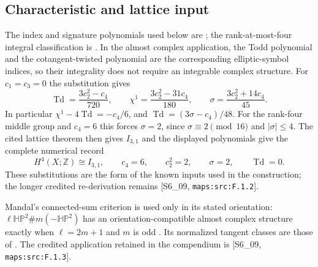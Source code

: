 \subsection{Characteristic and lattice input}
The index and signature polynomials used below are
\cite[equations (1.2)--(1.4), pp.~3--4]{ffEsoleKang}; the
rank-at-most-four integral classification is
\cite[Theorem 2.2.1, p.~61]{ffPetersSterk}.  In the almost
complex application, the Todd polynomial and the cotangent-twisted
polynomial are the corresponding elliptic-symbol indices, so their
integrality does not require an integrable complex structure.
For $c_1=c_3=0$ the substitution gives
\begin{equation}
\operatorname{Td}=\frac{3c_2^2-c_4}{720},\qquad
\chi^1=\frac{3c_2^2-31c_4}{180},\qquad
\sigma=\frac{3c_2^2+14c_4}{45}.
\label{maps:eq:F.1}
\end{equation}
In particular $\chi^1-4\operatorname{Td}=-c_4/6$, and
$\operatorname{Td}=(3\sigma-c_4)/48$.  For the rank-four middle
group and $c_4=6$ this forces $\sigma=2$, since
$\sigma\equiv2\pmod {16}$ and $|\sigma|\leq4$.
The cited lattice theorem then gives $I_{3,1}$ and the displayed
polynomials give the complete numerical record
\begin{equation}
 H^4(X;\mathbb Z)\cong I_{3,1},\qquad c_4=6,\qquad
 c_2^2=2,\qquad\sigma=2,\qquad\operatorname{Td}=0.
 \label{maps:eq:F.2}
\end{equation}
These substitutions are the form of the known inputs used in
the construction; the longer credited re-derivation remains
[S6\_09, \nolinkurl{maps:src:F.1.2}].

Mandal's connected-sum criterion is used only in its stated
orientation: $\ell\mathbb{HP}^2\#m(-\mathbb{HP}^2)$ has an
orientation-compatible almost complex structure exactly when
$\ell=2m+1$ and $m$ is odd
\cite[Corollary 1.4 and its proof in \S5]{ffMandal}.
Its normalized tangent classes are those of
\cite[Lemma 2.1 and Theorem 2.4, \S2]{ffMandal}.
The credited application retained in the compendium is
[S6\_09, \nolinkurl{maps:src:F.1.3}].
